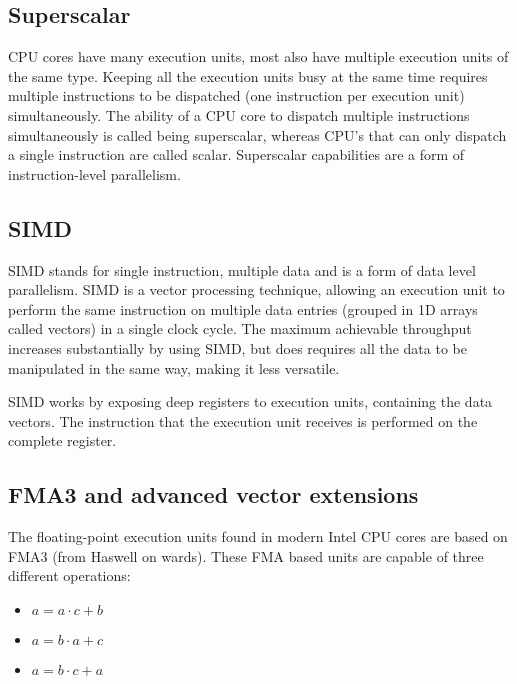 \subsection*{Superscalar}

\hspace{4mm}CPU cores have many execution units, most also have multiple execution units of the same type. Keeping all the execution units busy at the same time requires multiple instructions to be dispatched (one instruction per execution unit) simultaneously. The ability of a CPU core to dispatch multiple instructions simultaneously is called being superscalar\autocite[]{wiki_super}, whereas CPU's that can only dispatch a single instruction are called scalar. Superscalar capabilities are a form of instruction-level parallelism\autocite[]{wiki_ilp}.

\subsection*{SIMD}

\hspace{4mm}SIMD\autocite[]{wiki_simd} stands for single instruction, multiple data and is a form of data level parallelism\autocite[]{wiki_dlp}. SIMD is a vector processing technique, allowing an execution unit to perform the same instruction on multiple data entries (grouped in 1D arrays called vectors) in a single clock cycle. The maximum achievable throughput increases substantially by using SIMD, but does requires all the data to be manipulated in the same way, making it less versatile.\vspace{5mm}

SIMD works by exposing deep registers to execution units, containing the data vectors\autocite[]{wiki_register}. The instruction that the execution unit receives is performed on the complete register.

\newpage

\subsection*{FMA3 and advanced vector extensions}

\hspace{4mm}The floating-point execution units found in modern Intel CPU cores are based on FMA3 (from Haswell on wards). These FMA based units are capable of three different operations:

\begin{itemize}
    \item $ a = a \cdot c + b $
    \item $ a = b \cdot a + c $
    \item $ a = b \cdot c + a $
\end{itemize}

